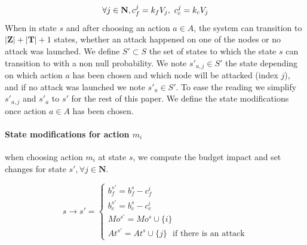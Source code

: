 \begin{equation}
\forall j \in \textbf{N}, c_f^j = k_{f}  V_j,~ c_c^j = k_{c}  V_j\\ 
\end{equation}
When in state $s$ and after choosing an action $a \in A$, the system can transition to $|\textbf{Z}|+|\textbf{T}| + 1 $ states, whether an attack happened on one of the nodes or no attack was launched.
We define $S' \subset S$ the set of states to which the state $s$ can transition to with a non null probability.
We note $s'_{a,j} \in S'$ the state depending on which action $a$ has been chosen and which node will be attacked (index $j$), and if no attack was launched we note $s'_a \in S'$. To ease the reading we simplify $s'_{a,j}$ and $s'_a$ to $s'$ for the rest of this paper.
We define the state modifications once action $a \in A$ has been chosen.
\\
\paragraph*{\textbf{State modifications for action $m_i$}}
when choosing action $m_i$ at state $s$, we compute the budget impact and set changes for state $s', \forall j \in \textbf{N}$. 

\begin{equation}
  s \longrightarrow s' =\begin{cases}
    b_f^{s'} = b_f^s - c_f^i\\
    b_c^{s'} = b_c^s - c_c^i\\
    Mo^{s'} = Mo^s \cup \{i\}\\
    At^{s'} = At^s \cup \{j\} \text{~~if there is an attack}
  \end{cases}
\end{equation}

